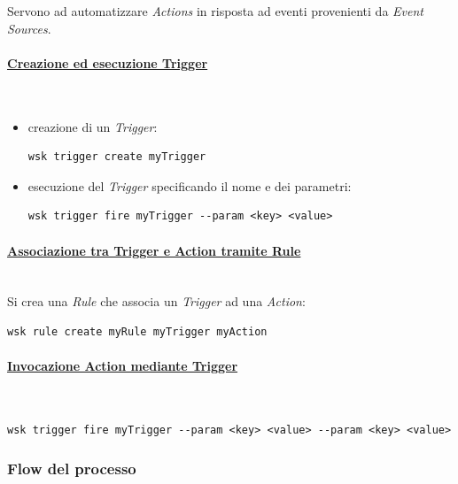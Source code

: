 \documentclass[12pt,a4paper,openany,twoside]{book}
\begin{document}
Servono ad automatizzare \textit{Actions} in risposta ad eventi provenienti da \textit{Event Sources}.

\paragraph{\underline{Creazione ed esecuzione Trigger}} ~
\begin{itemize}
    \item creazione di un \textit{Trigger}:
    \begin{lstlisting}
wsk trigger create myTrigger\end{lstlisting}
    
    \item esecuzione del \textit{Trigger} specificando il nome e dei parametri:
    \begin{lstlisting}
wsk trigger fire myTrigger --param <key> <value>\end{lstlisting}
\end{itemize}

\paragraph{\underline{Associazione tra Trigger e Action tramite Rule}} ~\\
Si crea una \textit{Rule} che associa un \textit{Trigger} ad una \textit{Action}:
\begin{lstlisting}
wsk rule create myRule myTrigger myAction\end{lstlisting}

\paragraph{\underline{Invocazione Action mediante Trigger}} ~
\begin{lstlisting}
wsk trigger fire myTrigger --param <key> <value> --param <key> <value>\end{lstlisting}

\subsubsection{Flow del processo}
\end{document}
